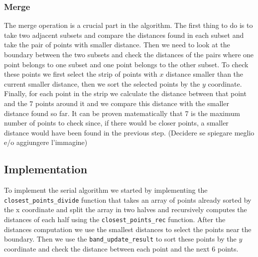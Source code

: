 \subsubsection{Merge}
The merge operation is a crucial part in the algorithm.
The first thing to do is to take two adjacent subsets and compare the distances
found in each subset and take the pair of points with smaller distance. Then we
need to look at the boundary between the two subsets and check the distances of
the pairs where one point belongs to one subset and one point belongs to the other
subset. To check these points we first select the strip of points with $x$ distance smaller
than the current smaller distance, then we sort the selected points by the $y$ coordinate.
Finally, for each point in the strip we calculate the distance between that point and
the $7$ points around it and we compare this distance with the smaller distance found so far.
It can be proven matematically that 7 is the maximum number of points to check since, if there
would be closer points, a smaller distance would have been found in the previous step.
(Decidere se spiegare meglio e/o aggiungere l'immagine)

\subsection{Implementation}
To implement the serial algorithm we started by implementing the \verb+closest_points_divide+
function that takes an array of points already sorted by the x coordinate and split the array in two
halves and recursively computes the distances of each half using the \verb+closest_points_rec+
function. After the distances computation we use the smallest distances to select the points
near the boundary. Then we use the \verb+band_update_result+ to sort these points by the $y$ coordinate
and check the distance between each point and the next 6 points.
